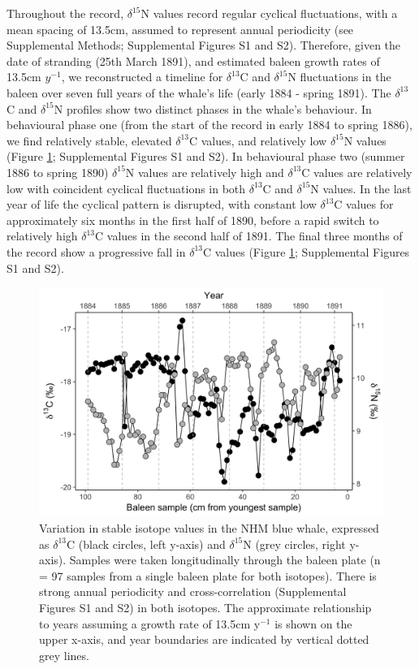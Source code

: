 \documentclass[9pt,twocolumn,twoside,lineno]{pnas-new}
\begin{document}
Throughout the record, $\delta^{15}$N values record regular cyclical fluctuations, with a mean spacing of 13.5cm, assumed to represent annual periodicity (see Supplemental Methods; Supplemental Figures S1 and S2). 
Therefore, given the date of stranding (25th March 1891), and estimated baleen growth rates of 13.5cm $y^{-1}$, we reconstructed a timeline for $\delta^{13}$C and $\delta^{15}$N fluctuations in the baleen over seven full years of the whale's life (early 1884 - spring 1891). 
The $\delta^{13}$C and $\delta^{15}$N profiles show two distinct phases in the whale's behaviour. 
In behavioural phase one (from the start of the record in early 1884 to spring 1886), we find relatively stable, elevated $\delta^{13}$C values, and relatively low $\delta^{15}$N values (Figure \ref{fig1}; Supplemental Figures S1 and S2). 
In behavioural phase two (summer 1886 to spring 1890) $\delta^{15}$N values are relatively high and $\delta^{13}$C values are relatively low with coincident cyclical fluctuations in both $\delta^{13}$C and $\delta^{15}$N values. 
In the last year of life the cyclical pattern is disrupted, with constant low $\delta^{13}$C values for approximately six months in the first half of 1890, before a rapid switch to relatively high $\delta^{13}$C values in the second half of 1891. 
The final three months of the record show a progressive fall in $\delta^{13}$C values (Figure \ref{fig1}; Supplemental Figures S1 and S2).

\begin{figure}
  \centering
  \includegraphics[width = \linewidth]{figures/Figure-1-raw-dC-dN-data.png}
  \caption{Variation in stable isotope values in the NHM blue whale, expressed as $\delta^{13}$C (black circles, left y-axis) and $\delta^{15}$N (grey circles, right y-axis). Samples were taken longitudinally through the baleen plate (n = 97 samples from a single baleen plate for both isotopes). There is strong annual periodicity and cross-correlation (Supplemental Figures S1 and S2) in both isotopes. The approximate relationship to years assuming a growth rate of 13.5cm y$^{-1}$ is shown on the upper x-axis, and year boundaries are indicated by vertical dotted grey lines.}
  \label{fig1}
\end{figure}
\end{document}
